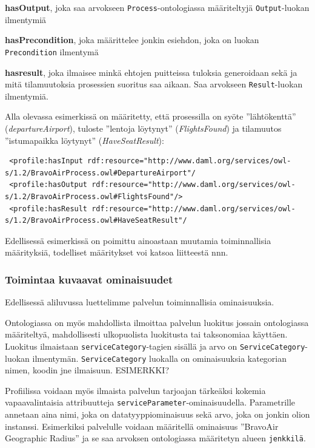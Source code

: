 \documentclass[finnish]{tktltiki2}
\theoremstyle{definition}
\theoremstyle{remark}
\begin{document}
\textbf{hasOutput}, joka saa arvokseen \texttt{Process}-ontologiassa määriteltyjä \texttt{Output}-luokan ilmentymiä


\textbf{hasPrecondition}, joka määrittelee jonkin esiehdon, joka on luokan \texttt{Precondition} ilmentymä


\textbf{hasresult}, joka ilmaisee minkä ehtojen puitteissa tuloksia generoidaan sekä ja mitä tilamuutoksia prosessien suoritus saa aikaan. Saa arvokseen \texttt{Result}-luokan ilmentymiä.  

Alla olevassa esimerkissä on määritetty, että prosessilla on syöte ''lähtökenttä'' (\textit{departureAirport}), tuloste ''lentoja löytynyt'' (\textit{FlightsFound}) ja 
tilamuutos ''istumapaikka löytynyt'' (\textit{HaveSeatResult})\cite{daml}:

\begin{verbatim}
 <profile:hasInput rdf:resource="http://www.daml.org/services/owl-s/1.2/BravoAirProcess.owl#DepartureAirport"/
 <profile:hasOutput rdf:resource="http://www.daml.org/services/owl-s/1.2/BravoAirProcess.owl#FlightsFound"/>
 <profile:hasResult rdf:resource="http://www.daml.org/services/owl-s/1.2/BravoAirProcess.owl#HaveSeatResult"/
\end{verbatim}

Edellisessä esimerkissä on poimittu ainoastaan muutamia toiminnallisia määrityksiä, todelliset määritykset voi katsoa liitteestä nnn. 

\subsubsection{Toimintaa kuvaavat ominaisuudet}

Edellisessä aliluvussa luettelimme palvelun toiminnallisia ominaisuuksia.

Ontologiassa on myös mahdollista ilmoittaa palvelun luokitus jossain ontologiassa määriteltyä, mahdollisesti ulkopuolista luokitusta tai taksonomiaa käyttäen. Luokitus ilmaistaan \texttt{serviceCategory}-tagien sisällä ja arvo on \texttt{ServiceCategory}-luokan ilmentymän.  \texttt{ServiceCategory} luokalla on ominaisuuksia kategorian nimen, koodin jne ilmaisuun\cite{OWLS}. ESIMERKKI?

Profiilissa voidaan myös ilmaista palvelun tarjoajan tärkeäksi kokemia vapaavalintaisia attribuutteja \texttt{serviceParameter}-ominaisuudella. Parametrille annetaan aina nimi, joka on datatyyppiominaisuus sekä arvo, joka on jonkin olion instanssi\cite{OWLS}. Esimerkiksi palvelulle voidaan määritellä ominaisuus ''BravoAir Geographic Radius'' ja se saa arvoksen ontologiassa määritetyn alueen \texttt{jenkkilä}.
\end{document}
